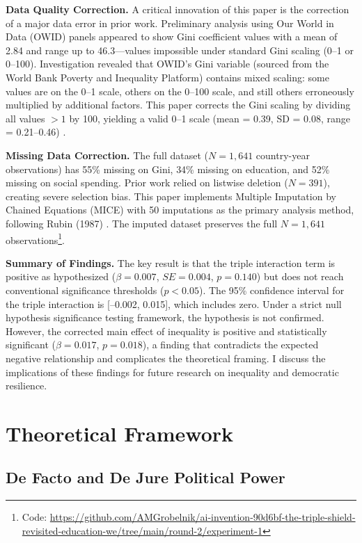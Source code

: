 \documentclass[11pt,letterpaper]{article}
\begin{document}
\textbf{Data Quality Correction.} A critical innovation of this paper is the correction of a major data error in prior work. Preliminary analysis using Our World in Data (OWID) panels appeared to show Gini coefficient values with a mean of 2.84 and range up to 46.3---values impossible under standard Gini scaling (0--1 or 0--100). Investigation revealed that OWID's Gini variable (sourced from the World Bank Poverty and Inequality Platform) contains mixed scaling: some values are on the 0--1 scale, others on the 0--100 scale, and still others erroneously multiplied by additional factors. This paper corrects the Gini scaling by dividing all values $> 1$ by 100, yielding a valid 0--1 scale (mean = 0.39, SD = 0.08, range = 0.21--0.46) \cite{OurWorldinData2024}.

\textbf{Missing Data Correction.} The full dataset ($N = 1,641$ country-year observations) has 55\% missing on Gini, 34\% missing on education, and 52\% missing on social spending. Prior work relied on listwise deletion ($N = 391$), creating severe selection bias. This paper implements Multiple Imputation by Chained Equations (MICE) with 50 imputations as the primary analysis method, following Rubin (1987) \cite{Rubin1987}. The imputed dataset preserves the full $N = 1,641$ observations\footnote{Code: \url{https://github.com/AMGrobelnik/ai-invention-90d6bf-the-triple-shield-revisited-education-we/tree/main/round-2/experiment-1}}.

\textbf{Summary of Findings.} The key result is that the triple interaction term is positive as hypothesized ($\beta = 0.007$, $SE = 0.004$, $p = 0.140$) but does not reach conventional significance thresholds ($p < 0.05$). The 95\% confidence interval for the triple interaction is [--0.002, 0.015], which includes zero. Under a strict null hypothesis significance testing framework, the hypothesis is not confirmed. However, the corrected main effect of inequality is positive and statistically significant ($\beta = 0.017$, $p = 0.018$), a finding that contradicts the expected negative relationship and complicates the theoretical framing. I discuss the implications of these findings for future research on inequality and democratic resilience.

\section{Theoretical Framework}

\subsection{De Facto and De Jure Political Power}
\end{document}
